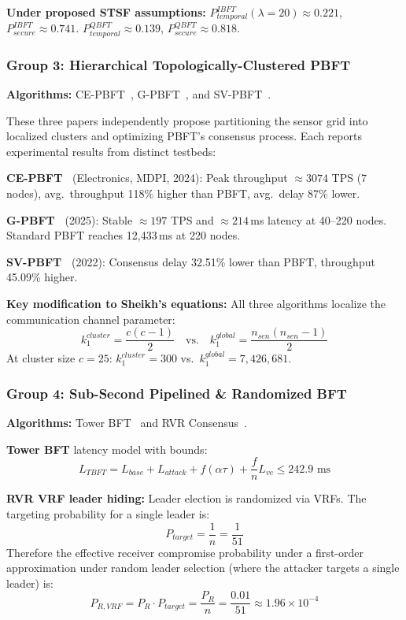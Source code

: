 \documentclass[10pt,twocolumn,letterpaper]{article}
\begin{document}
\textbf{Under proposed STSF assumptions:} $P_{temporal}^{IBFT}(\lambda=20) \approx 0.221$, $P_{secure}^{IBFT} \approx 0.741$. $P_{temporal}^{QBFT} \approx 0.139$, $P_{secure}^{QBFT} \approx 0.818$.

\subsubsection{Group 3: Hierarchical Topologically-Clustered PBFT}

\textbf{Algorithms:} CE-PBFT~\cite{ding2024}, G-PBFT~\cite{xu2025}, and SV-PBFT~\cite{suo2025}.

These three papers independently propose partitioning the sensor grid into localized clusters and optimizing PBFT's consensus process. Each reports experimental results from distinct testbeds:

\textbf{CE-PBFT~\cite{ding2024}} (Electronics, MDPI, 2024): Peak throughput $\approx 3074$ TPS (7 nodes), avg.\ throughput 118\% higher than PBFT, avg.\ delay 87\% lower.

\textbf{G-PBFT~\cite{xu2025}} (2025): Stable $\approx 197$ TPS and $\approx 214$\,ms latency at 40--220 nodes. Standard PBFT reaches 12,433\,ms at 220 nodes.

\textbf{SV-PBFT~\cite{suo2025}} (2022): Consensus delay 32.51\% lower than PBFT, throughput 45.09\% higher.

\textbf{Key modification to Sheikh's equations:} All three algorithms localize the communication channel parameter:
\begin{equation}
k_{1}^{cluster} = \frac{c(c-1)}{2} \quad \text{vs.} \quad k_{1}^{global} = \frac{n_{sen}(n_{sen}-1)}{2}
\end{equation}
At cluster size $c = 25$: $k_1^{cluster} = 300$ vs.\ $k_1^{global} = 7{,}426{,}681$.

\subsubsection{Group 4: Sub-Second Pipelined \& Randomized BFT}

\textbf{Algorithms:} Tower BFT~\cite{yakovenko2018} and RVR Consensus~\cite{wang2025}.

\textbf{Tower BFT} latency model with bounds:
\begin{equation}
L_{TBFT} = L_{base} + L_{attack} + f(\alpha\tau) + \frac{f}{n}L_{vc} \leq 242.9\text{ ms}
\end{equation}

\textbf{RVR VRF leader hiding:} Leader election is randomized via VRFs. The targeting probability for a single leader is:
\begin{equation}
P_{target} = \frac{1}{n} = \frac{1}{51}
\end{equation}
Therefore the effective receiver compromise probability under a first-order approximation under random leader selection (where the attacker targets a single leader) is:
\begin{equation}
P_{R,VRF} = P_R \cdot P_{target} = \frac{P_R}{n} = \frac{0.01}{51} \approx 1.96 \times 10^{-4}
\end{equation}
\end{document}
